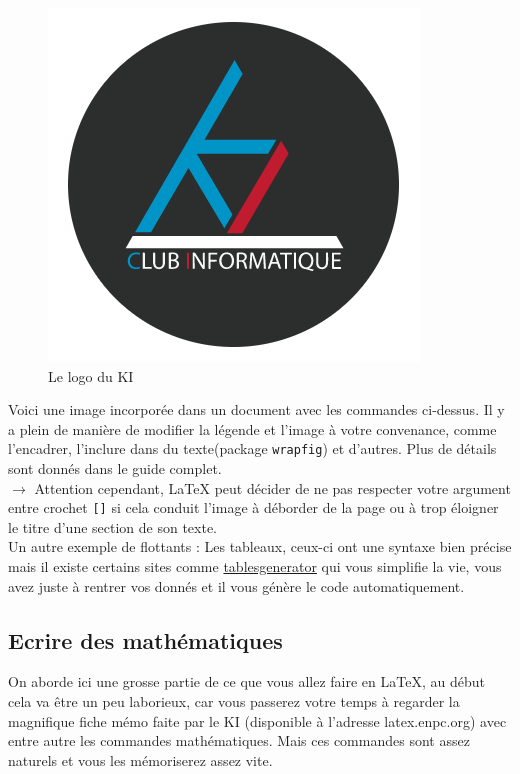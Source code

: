 \documentclass[11pt]{article}				%
\begin{document}
\begin{figure}[h!]
	\centering
	\includegraphics[scale=0.2]{ressources/KI.png}
	\caption{Le logo du KI}
\end{figure}



Voici une image incorporée dans un document avec les commandes ci-dessus. Il y a plein de manière de modifier la légende et l'image à votre convenance, comme l'encadrer, l'inclure dans du texte(package \texttt{wrapfig}) et d'autres. Plus de détails sont donnés dans le guide complet.\\


$\rightarrow$ Attention cependant, LaTeX peut décider de ne pas respecter votre argument entre crochet \texttt{[]} si cela conduit l'image à déborder de la page ou à trop éloigner le titre d'une section de son texte.\\

Un autre exemple de flottants : Les tableaux, ceux-ci ont une syntaxe bien précise mais il existe certains sites comme \href{https://www.tablesgenerator.com/}{tablesgenerator} qui vous simplifie la vie, vous avez juste à rentrer vos donnés et il vous génère le code automatiquement.


\subsection*{Ecrire des mathématiques}

On aborde ici une grosse partie de ce que vous allez faire en LaTeX, au début cela va être un peu laborieux, car vous passerez votre temps à regarder la magnifique fiche mémo faite par le KI (disponible à l'adresse latex.enpc.org) avec entre autre les commandes mathématiques. Mais ces commandes sont assez naturels et vous les mémoriserez assez vite.\\
\end{document}
